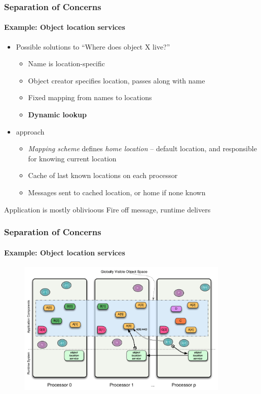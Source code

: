 \begin{frame}[t]
\frametitle{Separation of Concerns}
\framesubtitle{Example: Object location services}
\begin{itemize}
\item Possible solutions to ``Where does object X live?''
    \begin{itemize}
        \item Name is location-specific
        \item Object creator specifies location, passes along with name
        \item Fixed mapping from names to locations
        \item \textbf{Dynamic lookup}
    \end{itemize}
\pause
\item \charm approach
    \begin{itemize}
        \item \emph{Mapping scheme} defines \emph{home location} -- default location, and responsible for knowing current location
        \item Cache of last known locations on each processor
        \item Messages sent to cached location, or home if none known
    \end{itemize}
\end{itemize}
\pause
\begin{block}{Application is mostly oblivioous}
Fire off message, runtime delivers
\end{block}
\end{frame}


\begin{frame}
\frametitle{Separation of Concerns}
\framesubtitle{Example: Object location services}
  \begin{figure}\includegraphics[width=0.9\textwidth]{../figures/progmodel/18-locmgr.pdf}\end{figure}
\end{frame}


